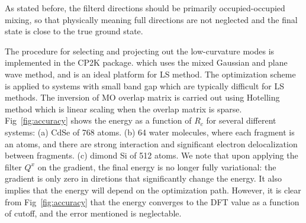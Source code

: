 \documentclass[aps,prl,twocolumn,reprint,amsmath,amssymb]{revtex4-1}
\begin{document}
As stated before, the filterd directions should be primarily occupied-occupied mixing, so that physically meaning full directions are not neglected and the final state is close to the true ground state. 



\label{marker:results}

The procedure for selecting and projecting out the low-curvature modes is implemented in the CP2K package\cite{cp2kgeneral}. which uses the mixed Gaussian and plane wave method\cite{vandevondele2005quickstep}, and is an ideal platform for LS method. The optimization scheme is applied to systems with small band gap which are typically difficult for LS methods. The inversion of MO overlap matrix is carried out using Hotelling method \cite{hotelling1943some} which is linear scaling when the overlap matrix is sparse. Fig~\ref{fig:accuracy} shows the energy as a function of $R_c$ for several different systems: (a) CdSe of 768 atoms. (b) 64 water molecules, where each fragment is an atoms, and there are strong interaction and significant electron delocalization between fragments. (c) dimond Si of 512 atoms. We note that upon applying the filter $Q^x$ on the gradient, the final energy is no longer fully variational: the gradient is only zero in diretions that significantly change the energy. It also implies that the energy will depend on the optimization path. However, it is clear from Fig~\ref{fig:accuracy} that the energy converges to the DFT value as a function of cutoff, and the error mentioned is neglectable. 
\end{document}

